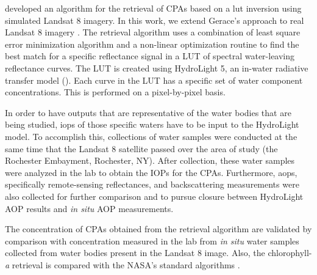 \cite{Gerace:2013} developed an algorithm for the retrieval of CPAs based on a \acrfull{lut} inversion using simulated Landsat 8 imagery. In this work, we extend Gerace's approach to real Landsat 8 imagery \cite{Concha2013IGARSS}. The retrieval algorithm uses a combination of least square error minimization algorithm and a non-linear optimization routine to find the best match for a specific reflectance signal in a LUT of spectral water-leaving reflectance curves. The LUT is created using HydroLight 5, an in-water radiative transfer model (\cite{Mobley:2005}). Each curve in the LUT has a specific set of water component concentrations. This is performed on a pixel-by-pixel basis. 

In order to have outputs that are representative of the water bodies that are being studied, \acrfull{iops} of those specific waters have to be input to the HydroLight model. To accomplish this, collections of water samples were conducted at the same time that the Landsat 8 satellite passed over the area of study (the Rochester Embayment, Rochester, NY). After collection, these water samples were analyzed in the lab to obtain the IOPs for the CPAs. Furthermore, \acrfull{aops}, specifically remote-sensing reflectances, and backscattering measurements were also collected for further comparison and to pursue closure between HydroLight AOP results and {\it in situ} AOP measurements.

The concentration of CPAs obtained from the retrieval algorithm are validated by comparison with concentration measured in the lab from {\it in situ} water samples collected from water bodies present in the Landsat 8 image. Also, the chlorophyll-{\it a} retrieval is compared with the NASA's standard algorithms \cite{OReilly1998_Chl,OReilly2000,Hu:2012fv}.